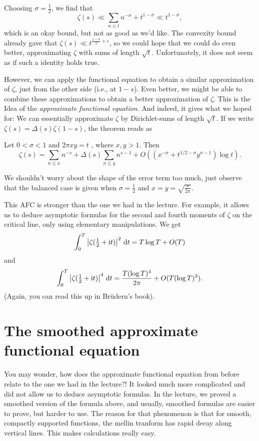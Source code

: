 \documentclass[a4paper,11pt]{article}
\begin{document}
Choosing $\sigma = \frac 12$, we find that 
\[
    \zeta(s) \ll \sum_{n \leq t} n^{-\sigma} + t^{1-\sigma} \ll t^{1- \sigma},
\]
which is an okay bound, but not as good as we'd like. The convexity bound already 
gave that $\zeta(s) \ll t^{\frac{1-\sigma}2 + \varepsilon}$, so we could hope 
that we could do even better, approximating $\zeta$ with sums of length $\sqrt t$.
Unfortunately, it does not seem as if such a identity holds true. 

However, we can apply the functional equation to obtain a similar approximation
of $\zeta$, just from the other side (i.e., at $1-s$). Even better, we might be
able to combine these approximations to obtain a better approximation of 
$\zeta$. This is the Idea of the \textit{approximate functional equation}. 
And indeed, it gives what we hoped for: We can essentially approximate $\zeta$ by
Dirichlet-sums of length $\sqrt t$. If we write $\zeta(s) = \Delta(s) \zeta(1-s)$,
the theorem reads as
\begin{thm}
    Let $0 < \sigma < 1$ and $2 \pi xy = t$ , where $x,y > 1$. Then
    \[
    \zeta(s) = \sum_{n \leq x}n^{-s} + \Delta(s) \sum_{n \leq y} n^{s-1} 
    + O((x^{-\sigma} + t^{1/2-\sigma} y^{\sigma-1}) \log t).
    \]
\end{thm}
We shouldn't worry about the shape of the error term too much, just observe that 
the balanced case is given when $\sigma = \frac 12$ and $x=y= \sqrt{\frac x
{2\pi}}.$ 

This AFC is stronger than the one we had in the lecture. For example, it allows
us to deduce asymptotic formulas for the second and fourth moments of $\zeta$
on the critical line, only using elementary manipulations. We get
\[
    \int_0^T \left\lvert \zeta(\tfrac 12 + \mathrm i t) \right\rvert^2 \mathrm{\,d} t = T \log T + O(T)
\]
and 
\[
    \int_0^T \left\lvert \zeta(\tfrac 12 + \mathrm i t) \right\rvert^4 \mathrm{\,d} t = \frac{T (\log T)^4}{2\pi} + 
    O(T(\log T)^3).
\]
(Again, you can read this up in Brüdern's book).



\section{The smoothed approximate functional equation} %
\label{sec:Our approximate functional equation}
You may wonder, how does the approximate functional equation from before relate
to the one we had in the lecture?! It looked much more complicated and did not
allow us to deduce asymptotic formulas. In the lecture, we proved a smoothed
version of the formula above, and usually, smoothed formulas are easier to
prove, but harder to use. The reason for that phenomenon is that 
for smooth, compactly supported functions, the mellin tranform has rapid
decay along vertical lines. This makes calculations really easy.

\end{document}
